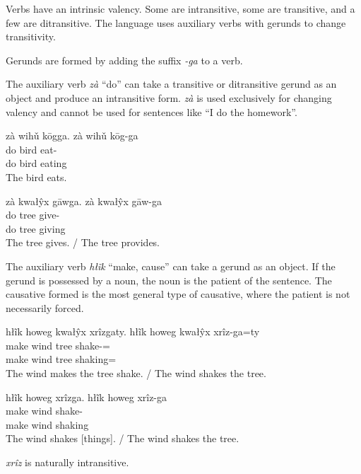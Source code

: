 \documentclass[12pt]{article}
\begin{document}
    Verbs have an intrinsic valency.
    Some are intransitive, some are transitive, and a few are ditransitive.
    The language uses auxiliary verbs with gerunds to change transitivity.

    Gerunds are formed by adding the suffix \textit{-ga} to a verb.

    The auxiliary verb \textit{zà} ``do''
    can take a transitive or ditransitive gerund as an object
    and produce an intransitive form.
    \textit{zà} is used exclusively for changing valency
    and cannot be used for sentences like ``I do the homework''.

    \begin{exe}
        \ex
        \glt
        zà wihǔ kōgga.
        \glll
        zà wihǔ kōg-ga \\
        do bird eat-\Ger{} \\
        do bird eating \\
        \glt
        The bird eats.
    \end{exe}

    \begin{exe}
        \ex
        \glt
        zà kwałŷx gāwga.
        \glll
        zà kwałŷx gāw-ga \\
        do tree give-\Ger{} \\
        do tree giving \\
        \glt
        The tree gives.
        /
        The tree provides.
    \end{exe}

    The auxiliary verb \textit{hłĩk} ``make, cause''
    can take a gerund as an object.
    If the gerund is possessed by a noun,
    the noun is the patient of the sentence.
    The causative formed is the most general type of causative,
    where the patient is not necessarily forced.

    \begin{exe}
        \ex
        \glt
        hłĩk howeg kwałŷx xrîzgaty.
        \glll
        hłĩk howeg kwałŷx xrîz-ga=ty \\
        make wind tree shake-\Ger{}=\Poss{} \\
        make wind tree shaking=\Poss{} \\
        \glt
        The wind makes the tree shake.
        /
        The wind shakes the tree.
    \end{exe}

    \begin{exe}
        \ex
        \glt
        hłĩk howeg xrîzga.
        \glll
        hłĩk howeg xrîz-ga \\
        make wind shake-\Ger{} \\
        make wind shaking \\
        \glt
        The wind shakes [things].
        /
        The wind shakes the tree.
    \end{exe}
    \textit{xrîz} is naturally intransitive.
\end{document}
